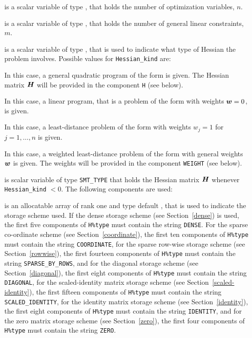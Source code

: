 \documentclass{galahad}
\begin{document}
\begin{description}

 is a scalar variable of type \integer,
 that holds the number of optimization variables, $n$.

 is a scalar variable of type \integer,
 that holds the number of general linear constraints, $m$.

 is a scalar variable of type \integer,
that is used to indicate what type of Hessian the problem involves.
Possible values for {\tt Hessian\_kind} are:

\begin{description}
  In this case, a general quadratic program of the form
 is given. The Hessian matrix ${\bm{H}}$ will be provided in the
component {\tt H} (see below).

  In this case, a linear program, that is a problem of the form
 with weights ${\bm{w}} = 0$, is given.

 In this case, a least-distance problem of the form 
with weights $w_{j} = 1$ for $j = 1, \ldots , n$ is given.

 In this case, a weighted least-distance problem of the form 
with general weights ${\bm{w}}$ is given. The weights will be
provided in the component {\tt WEIGHT} (see below).
\end{description}

 is scalar variable of type {\tt SMT\_TYPE}
that holds the Hessian matrix ${\bm{H}}$ whenever {\tt Hessian\_kind} $<0$.
The following components are used:

\begin{description}

 is an allocatable array of rank one and type default \character,
that is used to indicate the storage scheme used. If the dense storage scheme
(see Section~\ref{dense}) is used,
the first five components of {\tt H\%type} must contain the
string {\tt DENSE}.
For the sparse co-ordinate scheme (see Section~\ref{coordinate}),
the first ten components of {\tt H\%type} must contain the
string {\tt COORDINATE},
for the sparse row-wise storage scheme (see Section~\ref{rowwise}),
the first fourteen components of {\tt H\%type} must contain the
string {\tt SPARSE\_BY\_ROWS},
and for the diagonal storage scheme (see Section~\ref{diagonal}),
the first eight components of {\tt H\%type} must contain the
string {\tt DIAGONAL},
for the scaled-identity matrix storage scheme
(see Section~\ref{scaled-identity}),
the first fifteen components of {\tt H\%type} must contain the
string {\tt SCALED\_IDENTITY},
for the identity matrix storage scheme (see Section~\ref{identity}),
the first eight components of {\tt H\%type} must contain the
string {\tt IDENTITY}, and
for the zero matrix storage scheme
(see Section~\ref{zero}),
the first four components of {\tt H\%type} must contain the
string {\tt ZERO}.


\end{description}
\end{description}
\end{document}
